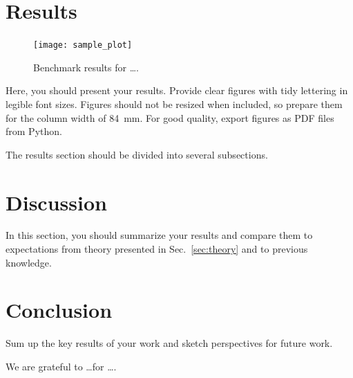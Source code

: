 \documentclass[sigconf, nonacm, natbib, screen, balance=False]{acmart}
\begin{document}
\section{Results}\label{sec:results}

\begin{figure}
  \centering
  \texttt{[image: sample\_plot]}
  \caption{Benchmark results for \dots.}
  \label{fig:bench}
\end{figure}

Here, you should present your results. Provide clear figures with tidy
lettering in legible font sizes. Figures should not be resized when
included, so prepare them for the column width of 84~mm. For good
quality, export figures as PDF files from Python.

The results section should be divided into several subsections.

\section{Discussion}\label{sec:discussion}

In this section, you should summarize your results and compare them to
expectations from theory presented in Sec.~\ref{sec:theory} and to
previous knowledge.

\section{Conclusion}\label{sec:conclusion}

Sum up the key results of your work and sketch perspectives for future work.

\begin{acks}
We are grateful to \dots for \dots.
\end{acks}




\end{document}
